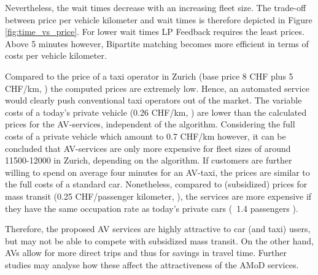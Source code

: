 Nevertheless, the wait times decrease with an increasing fleet size. The trade-off between price per vehicle kilometer and wait times is therefore depicted in Figure \ref{fig:time_vs_price}. For lower wait times LP Feedback requires the least prices. Above 5 minutes however, Bipartite matching becomes more efficient in terms of costs per vehicle kilometer. 


Compared to the price of a taxi operator in Zurich (base price 8 CHF plus 5 CHF/km, \cite{StadtZurich2014})
the computed prices are extremely low. Hence, an automated service would clearly
push conventional taxi operators out of the market. The variable costs of a today's 
private vehicle (0.26 CHF/km, \cite{TCS2016}) are lower than the calculated prices for the AV-services, 
independent of the algorithm. Considering the full costs of a private vehicle which amount to 0.7 CHF/km \cite{TCS2016} however, it can be concluded that AV-services are only more expensive for fleet sizes of around 11500-12000 
in Zurich, depending on the algorithm. If customers are further willing to spend on average four minutes 
for an AV-taxi, the prices are similar to the full costs of a standard car.
Nonetheless, compared to (subsidized) prices for mass transit (0.25 CHF/passenger kilometer, \cite{Bosch2016a}), the services are more expensive if they have the same occupation rate as today's private cars (~1.4 passengers \cite{Bosch2016a}).

Therefore, the proposed AV services are highly attractive to car (and taxi) users, but may
not be able to compete with subsidized mass transit. On the other hand, AVs
allow for more direct trips and thus for savings in travel time. Further studies
may analyse how these affect the attractiveness of the AMoD services.



